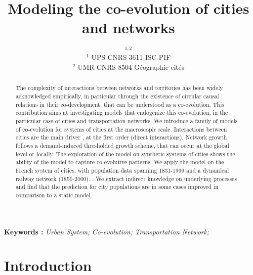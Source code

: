 


\title{Modeling the co-evolution of cities and networks}
\author{$^{1,2}$\\
$^1$ UPS CNRS 3611 ISC-PIF\\
$^2$ UMR CNRS 8504 G{\'e}ographie-cit{\'e}s
}
\date{}


\maketitle

\justify


\begin{abstract}
The complexity of interactions between networks and territories has been widely acknowledged empirically, in particular through the existence of circular causal relations in their co-development, that can be understood as a co-evolution. This contribution aims at investigating models that endogenize this co-evolution, in the particular case of cities and transportation networks. We introduce a family of models of co-evolution for systems of cities at the macroscopic scale. Interactions between cities are the main driver ,  at the first order (direct interactions). Network growth follows a demand-induced thresholded growth scheme, that can occur at the global level or locally. The exploration of the model on synthetic systems of cities shows the ability of the model to capture co-evolutive patterns. We apply the model on the French system of cities, with population data spanning 1831-1999 and a dynamical railway network (1850-2000). . We extract  indirect knowledge on underlying processes and find that the prediction for city populations are in some cases improved in comparison to a static model.
\end{abstract}

\textbf{Keywords : }\textit{Urban System; Co-evolution; Transportation Network; }



\section{Introduction}


